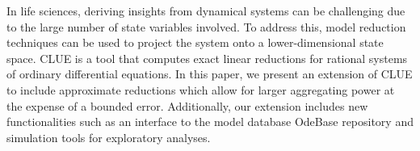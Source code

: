 
In life sciences, deriving insights from dynamical systems can be challenging due to the large number of state variables involved. 
To address this, model reduction techniques can be used to project the system onto a lower-dimensional state space.
CLUE is a tool that computes exact linear reductions for rational systems of ordinary differential equations.
In this paper, we present an extension of CLUE to include approximate reductions which allow for larger aggregating power at the expense of a bounded error.
Additionally, our extension includes new functionalities such as an interface to the model database OdeBase repository and simulation tools for exploratory analyses.

